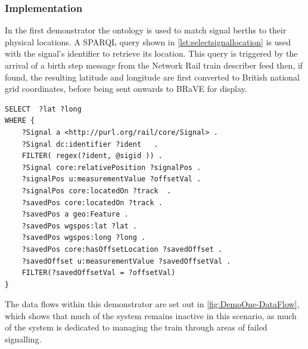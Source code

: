 \subsubsection{Implementation}
In the first demonstrator the ontology is used to match signal berths to their physical locations. A SPARQL query shown in \autoref{lst:selectsignallocation} is used with the signal's identifier to retrieve its location. This query is triggered by the arrival of a birth step message from the Network Rail train describer feed then, if found, the resulting latitude and longitude are first converted to British national grid coordinates, before being sent onwards to BRaVE for display. 

\begin{lstlisting}[float=h,language=sparql,frame=tb,caption={SPARQL to select a signal location from its identifier. Note some of the features here are Stardog specific, in particular the passing in of the @sigid parameter},label={lst:selectsignallocation}]
SELECT  ?lat ?long
WHERE {
    ?Signal a <http://purl.org/rail/core/Signal> .
    ?Signal dc:identifier ?ident   .
    FILTER( regex(?ident, @sigid )) .
    ?Signal core:relativePosition ?signalPos .
    ?signalPos u:measurementValue ?offsetVal .
    ?signalPos core:locatedOn ?track  .
    ?savedPos core:locatedOn ?track .
    ?savedPos a geo:Feature .
    ?savedPos wgspos:lat ?lat .
    ?savedPos wgspos:long ?long .   
    ?savedPos core:hasOffsetLocation ?savedOffset .
    ?savedOffset u:measurementValue ?savedOffsetVal .  
    FILTER(?savedOffsetVal = ?offsetVal)
}
\end{lstlisting}

\pagebreak

The data flows within this demonstrator are set out in \autoref{fig:DemoOne-DataFlow}, which shows that much of the system remains inactive in this scenario, as much of the system is dedicated to managing the train through areas of failed signalling.

